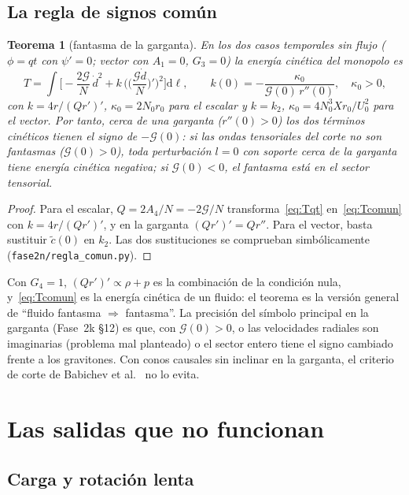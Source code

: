 \documentclass[11pt,a4paper]{article}
\newtheorem{teorema}{Teorema}
\theoremstyle{remark}
\newcommand{\G}{\mathcal G}
\newcommand{\dd}{\mathrm d}
\begin{document}
\subsection{La regla de signos común}

\begin{teorema}[fantasma de la garganta]\label{teo:fantasma}
En los dos casos temporales sin flujo ($\phi=qt$ con $\psi'=0$; vector con $A_1=0$, $G_3=0$) la energía cinética del monopolo es
\begin{equation}
T=\int\Big[-\frac{2\G}{N}\,\dot d^2+k\,\Big(\Big(\frac{\G\dot d}{N}\Big)'\Big)^2\Big]\dd\ell,\qquad k(0)=-\frac{\kappa_0}{\G(0)\,r''(0)},\quad \kappa_0>0,
\label{eq:Tcomun}
\end{equation}
con $k=4r/(Qr')'$, $\kappa_0=2N_0r_0$ para el escalar y $k=k_2$, $\kappa_0=4N_0^3Xr_0/U_0^2$ para el vector. Por tanto, cerca de una garganta ($r''(0)>0$) los dos términos cinéticos tienen el signo de $-\G(0)$: si las ondas tensoriales del corte no son fantasmas ($\G(0)>0$), toda perturbación $l=0$ con soporte cerca de la garganta tiene energía cinética negativa; si $\G(0)<0$, el fantasma está en el sector tensorial.
\end{teorema}

\begin{proof}
Para el escalar, $Q=2A_4/N=-2\G/N$ transforma~\eqref{eq:Tqt} en~\eqref{eq:Tcomun} con $k=4r/(Qr')'$, y en la garganta $(Qr')'=Qr''$. Para el vector, basta sustituir $\tilde c(0)$ en $k_2$. Las dos sustituciones se comprueban simbólicamente (\texttt{fase2n/regla\_comun.py}).
\end{proof}

Con $G_4=1$, $(Qr')'\propto\rho+p$ es la combinación de la condición nula, y~\eqref{eq:Tcomun} es la energía cinética de un fluido: el teorema es la versión general de ``fluido fantasma $\Rightarrow$ fantasma''. La precisión del símbolo principal en la garganta (Fase~2k \S12) es que, con $\G(0)>0$, o las velocidades radiales son imaginarias (problema mal planteado) o el sector entero tiene el signo cambiado frente a los gravitones. Con conos causales sin inclinar en la garganta, el criterio de corte de Babichev et al.~\cite{BCEL1,BCEL2} no lo evita.

\section{Las salidas que no funcionan}\label{sec:salidas}

\subsection{Carga y rotación lenta}
\end{document}
